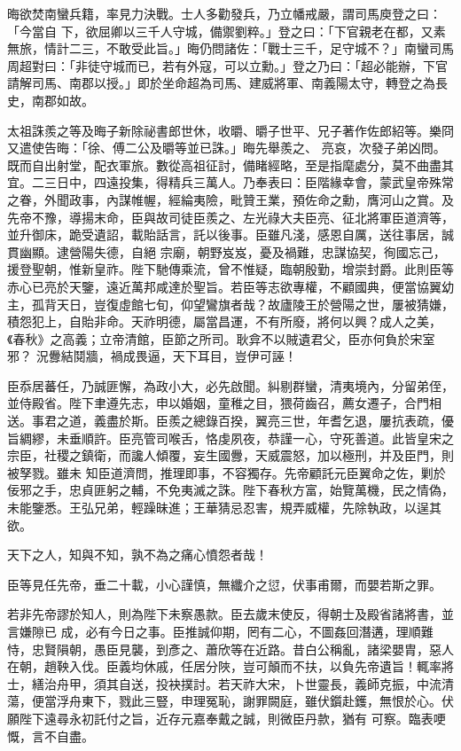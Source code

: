 \begin{pinyinscope}
 晦欲焚南蠻兵籍，率見力決戰。士人多勸發兵，乃立幡戒嚴，謂司馬庾登之曰：「今當自
 下，欲屈卿以三千人守城，備禦劉粹。」登之曰：「下官親老在都，又素無旅，情計二三，不敢受此旨。」晦仍問諸佐：「戰士三千，足守城不？」南蠻司馬周超對曰：「非徒守城而已，若有外寇，可以立勳。」登之乃曰：「超必能辦，下官請解司馬、南郡以授。」即於坐命超為司馬、建威將軍、南義陽太守，轉登之為長史，南郡如故。



 太祖誅羨之等及晦子新除祕書郎世休，收㬭、㬭子世平、兄子著作佐郎紹等。樂冏又遣使告晦：「徐、傅二公及㬭等並已誅。」晦先舉羨之、
 亮哀，次發子弟凶問。既而自出射堂，配衣軍旅。數從高祖征討，備睹經略，至是指麾處分，莫不曲盡其宜。二三日中，四遠投集，得精兵三萬人。乃奉表曰：臣階緣幸會，蒙武皇帝殊常之眷，外聞政事，內謀帷幄，經綸夷險，毗贊王業，預佐命之勳，膺河山之賞。及先帝不豫，導揚末命，臣與故司徒臣羨之、左光祿大夫臣亮、征北將軍臣道濟等，並升御床，跪受遺詔，載貽話言，託以後事。臣雖凡淺，感恩自厲，送往事居，誠貫幽顯。逮營陽失德，自絕
 宗廟，朝野岌岌，憂及禍難，忠謀協契，徇國忘己，援登聖朝，惟新皇祚。陛下馳傳乘流，曾不惟疑，臨朝殷勤，增崇封爵。此則臣等赤心已亮於天鑒，遠近萬邦咸達於聖旨。若臣等志欲專權，不顧國典，便當協翼幼主，孤背天日，豈復虛館七旬，仰望鸞旗者哉？故廬陵王於營陽之世，屢被猜嫌，積怨犯上，自貽非命。天祚明德，屬當昌運，不有所廢，將何以興？成人之美，《春秋》之高義；立帝清館，臣節之所司。耿弇不以賊遺君父，臣亦何負於宋室邪？
 況釁結鬩牆，禍成畏逼，天下耳目，豈伊可誣！



 臣忝居蕃任，乃誠匪懈，為政小大，必先啟聞。糾剔群蠻，清夷境內，分留弟侄，並侍殿省。陛下聿遵先志，申以婚姻，童稚之目，猥荷齒召，薦女遷子，合門相送。事君之道，義盡於斯。臣羨之總錄百揆，翼亮三世，年耆乞退，屢抗表疏，優旨綢繆，未垂順許。臣亮管司喉舌，恪虔夙夜，恭謹一心，守死善道。此皆皇宋之宗臣，社稷之鎮衛，而讒人傾覆，妄生國釁，天威震怒，加以極刑，并及臣門，則被孥戮。雖未
 知臣道濟問，推理即事，不容獨存。先帝顧託元臣翼命之佐，剿於佞邪之手，忠貞匪躬之輔，不免夷滅之誅。陛下春秋方富，始覽萬機，民之情偽，未能鑒悉。王弘兄弟，輕躁昧進；王華猜忌忍害，規弄威權，先除執政，以逞其欲。



 天下之人，知與不知，孰不為之痛心憤怨者哉！



 臣等見任先帝，垂二十載，小心謹慎，無纖介之愆，伏事甫爾，而嬰若斯之罪。



 若非先帝謬於知人，則為陛下未察愚款。臣去歲末使反，得朝士及殿省諸將書，並言嫌隙已
 成，必有今日之事。臣推誠仰期，罔有二心，不圖姦回潛遘，理順難恃，忠賢隕朝，愚臣見襲，到彥之、蕭欣等在近路。昔白公稱亂，諸梁嬰胄，惡人在朝，趙鞅入伐。臣義均休戚，任居分陜，豈可顛而不扶，以負先帝遺旨！輒率將士，繕治舟甲，須其自送，投袂撲討。若天祚大宋，卜世靈長，義師克振，中流清蕩，便當浮舟東下，戮此三豎，申理冤恥，謝罪闕庭，雖伏鑕赴鑊，無恨於心。伏願陛下遠尋永初託付之旨，近存元嘉奉戴之誠，則微臣丹款，猶有
 可察。臨表哽慨，言不自盡。




\end{pinyinscope}
